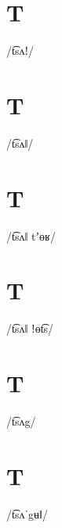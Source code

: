 \documentclass[10pt,a4paper,twoside]{book}
\begin{document}
\section*{T}

\begin{multicols}{3}
 {/t͡sʌǃ/} {}
\end{multicols}

\section*{T}

\begin{multicols}{3}
 {/t͡sʌǁ/} {}
\end{multicols}

\section*{T}

\begin{multicols}{3}
 {/t͡sʌǁ tʼɵʁ/} {}
\end{multicols}

\section*{T}

\begin{multicols}{3}
 {/t͡sʌǁ ǃɵt͡s/} {}
\end{multicols}

\section*{T}

\begin{multicols}{3}
 {/t͡sʌg/} {}
\end{multicols}

\section*{T}

\begin{multicols}{3}
 {/t͡sʌˈgʉǁ/} {}
\end{multicols}
\end{document}
